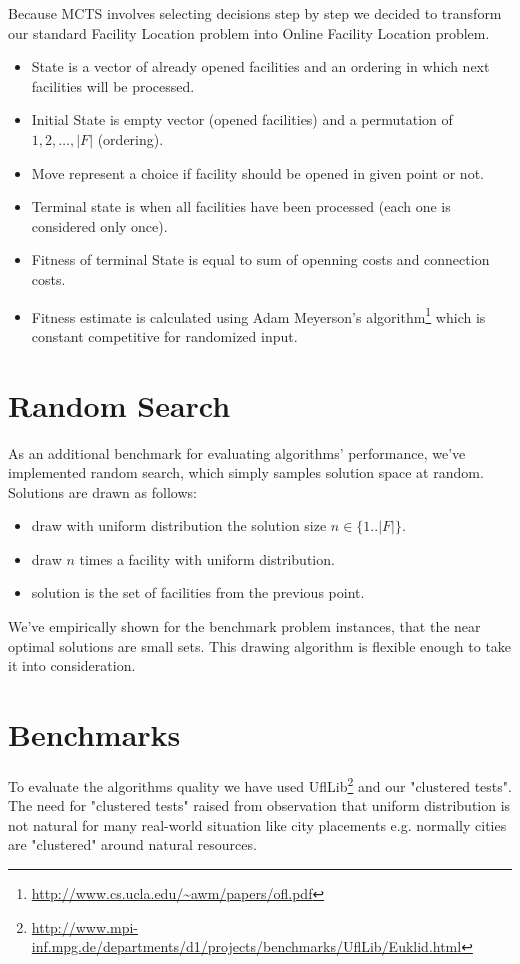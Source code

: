 Because MCTS involves selecting decisions step by step we decided to transform our
standard Facility Location problem into Online Facility Location problem.
\begin{itemize}
\item State is a vector of already opened facilities and an ordering in which
next facilities will be processed.
\item Initial State is empty vector (opened facilities) and a permutation
of $1,2,\dots, |F|$ (ordering).
\item Move represent a choice if facility should be opened in given point or not.
\item Terminal state is when all facilities have been processed (each one is
considered only once).
\item Fitness of terminal State is equal to sum of openning costs and connection costs.
\item Fitness estimate is calculated using Adam Meyerson's algorithm\footnote{\url{http://www.cs.ucla.edu/~awm/papers/ofl.pdf}}
which is constant competitive for randomized input.
\end{itemize}

\section{Random Search}

As an additional benchmark for evaluating algorithms' performance, we've implemented
random search, which simply samples solution space at random. Solutions are drawn as follows:
\begin{itemize}
\item draw with uniform distribution the solution size $n \in \{1..|F|\}$.
\item draw $n$ times a facility with uniform distribution.
\item solution is the set of facilities from the previous point.
\end{itemize}

We've empirically shown for the benchmark problem instances, that the near optimal
solutions are small sets. This drawing algorithm is flexible enough to take it
into consideration.

\section{Benchmarks}
To evaluate the algorithms quality we have used UflLib\footnote{\url{http://www.mpi-inf.mpg.de/departments/d1/projects/benchmarks/UflLib/Euklid.html}}
and our "clustered tests". The need for "clustered tests" raised from observation that
uniform distribution is not natural for many real-world situation like city placements
e.g. normally cities are "clustered" around natural resources.

